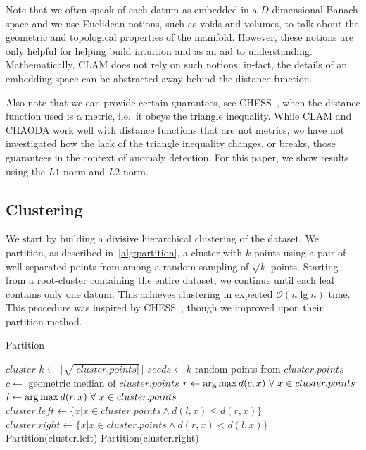 Note that we often speak of each datum as embedded in a $D$-dimensional Banach space and we use Euclidean notions, such as voids and volumes, to talk about the geometric and topological properties of the manifold.
However, these notions are only helpful for helping build intuition and as an aid to understanding.
Mathematically, CLAM does not rely on such notions; in-fact, the details of an embedding space can be abstracted away behind the distance function.

Also note that we can provide certain guarantees, see CHESS~\cite{ishaq2019clustered}, when the distance function used is a metric, i.e.\ it obeys the triangle inequality.
While CLAM and CHAODA work well with distance functions that are not metrics, we have not investigated how the lack of the triangle inequality changes, or breaks, those guarantees in the context of anomaly detection.
For this paper, we show results using the $L1$-norm and $L2$-norm.


\subsection{Clustering}
\label{subsec:methods:clustering}

We start by building a divisive hierarchical clustering of the dataset.
We partition, as described in~\ref{alg:partition}, a cluster with $k$ points using a pair of well-separated points from among a random sampling of $\sqrt k$ points.
Starting from a root-cluster containing the entire dataset, we continue until each leaf contains only one datum.
This achieves clustering in expected $\mathcal{O}(n \lg n)$ time.
This procedure was inspired by CHESS~\cite{ishaq2019clustered}, though we improved upon their partition method.

\begin{algorithm} %
\caption{Partition} %
\label{alg:partition} %
\begin{algorithmic}[1] %
    \REQUIRE $cluster$
    \STATE $k \leftarrow \lfloor \sqrt{|cluster.points|} \rfloor$
    \STATE $seeds \leftarrow k$ random points from $cluster.points$
    \STATE $c \leftarrow$ geometric median of $cluster.points$
    \STATE $r \leftarrow \operatorname*{arg\,max} d(c,x) \ \forall \ x \in cluster.points$
    \STATE $l \leftarrow \operatorname*{arg\,max} d(r,x) \ \forall \ x \in cluster.points$
    \STATE $cluster.left \leftarrow \{x | x \in cluster.points \land d(l,x) \le d(r,x)\}$
    \STATE $cluster.right \leftarrow \{x | x \in cluster.points \land d(r,x) < d(l,x)\}$
        \STATE Partition(cluster.left)
    \ENDIF
        \STATE Partition(cluster.right)
    \ENDIF
\end{algorithmic}
\end{algorithm}

